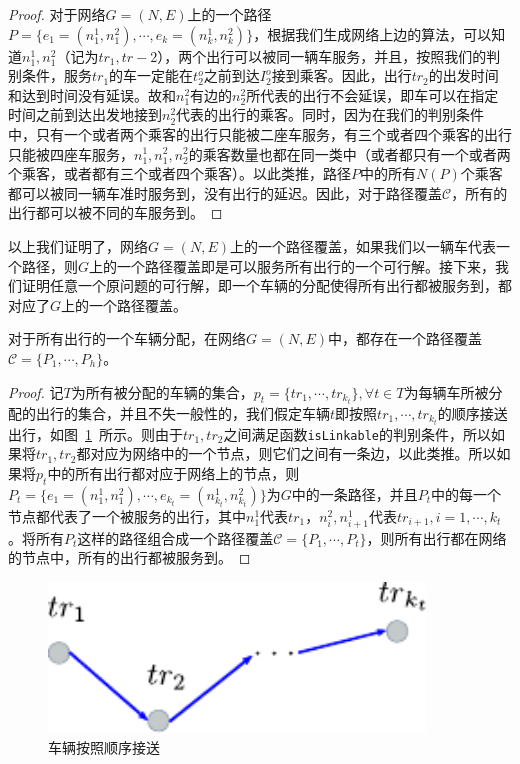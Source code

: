 \begin{proof}
对于网络$G = (N,E)$上的一个路径$P= \{e_1 = (n_1^1, n_1^2),\cdots, e_k = (n_k^1,n_k^2)\}$，根据我们生成网络上边的算法，可以知道$n_1^1,n_1^2$（记为$tr_1,tr-2$），两个出行可以被同一辆车服务，并且，按照我们的判别条件，服务$tr_1$的车一定能在$t_2^o$之前到达$I_2^o$接到乘客。因此，出行$tr_2$的出发时间和达到时间没有延误。故和$n_1^2$有边的$n_2^2$所代表的出行不会延误，即车可以在指定时间之前到达出发地接到$n_2^2$代表的出行的乘客。同时，因为在我们的判别条件中，只有一个或者两个乘客的出行只能被二座车服务，有三个或者四个乘客的出行只能被四座车服务，$n_1^1,n_1^2,n_2^2$的乘客数量也都在同一类中（或者都只有一个或者两个乘客，或者都有三个或者四个乘客）。以此类推，路径$P$中的所有$N(P)$个乘客都可以被同一辆车准时服务到，没有出行的延迟。因此，对于路径覆盖$\mathcal{C}$，所有的出行都可以被不同的车服务到。
\end{proof}
\par
以上我们证明了，网络$G = (N, E)$上的一个路径覆盖，如果我们以一辆车代表一个路径，则$G$上的一个路径覆盖即是可以服务所有出行的一个可行解。接下来，我们证明任意一个原问题的可行解，即一个车辆的分配使得所有出行都被服务到，都对应了$G$上的一个路径覆盖。
\begin{theorem}\label{theo:origin}
对于所有出行的一个车辆分配，在网络$G = (N, E)$中，都存在一个路径覆盖$\mathcal{C} = \{P_1,\cdots, P_h\}$。
\end{theorem}
\begin{proof}
记$T$为所有被分配的车辆的集合，$p_t = \{tr_1,\cdots, tr_{k_t}\}, \forall t \in T$为每辆车所被分配的出行的集合，并且不失一般性的，我们假定车辆$t$即按照$tr_1,\cdots,tr_{k_t}$的顺序接送出行，如图~\ref{fig:pathproof}~所示。则由于$tr_1,tr_2$之间满足函数\texttt{isLinkable}的判别条件，所以如果将$tr_1,tr_2$都对应为网络中的一个节点，则它们之间有一条边，以此类推。所以如果将$p_t$中的所有出行都对应于网络上的节点，则$P_t = \{e_1 = (n_1^1, n_1^2),\cdots, e_{k_t} = (n_{k_t}^1, n_{k_t}^2)\}$为$G$中的一条路径，并且$P_t$中的每一个节点都代表了一个被服务的出行，其中$n_1^1$代表$tr_1$，$n_i^2, n_{i+1}^1$代表$tr_{i+1}, i = 1,\cdots, k_t$。将所有$P_t$这样的路径组合成一个路径覆盖$\mathcal{C} = \{P_1,\cdots, P_t\}$，则所有出行都在网络的节点中，所有的出行都被服务到。
\end{proof}
\begin{figure}
\centering
\includegraphics[width = 10cm]{./figures/img/pathproof.pdf}
\caption{车辆按照顺序接送}
\label{fig:pathproof}
\end{figure}
